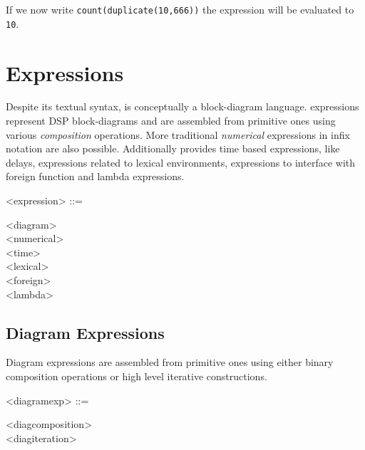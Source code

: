 \documentclass[a4paper,10pt]{book}
\begin{document}
If we now write \lstinline'count(duplicate(10,666))' the expression will be evaluated to \lstinline'10'.





 
  
\section{Expressions}

Despite its textual syntax, \faust is conceptually a block-diagram language. \faust expressions represent DSP block-diagrams and are assembled from primitive ones using various \textit{composition} operations. More traditional \textit{numerical} expressions in infix notation are also possible. Additionally \faust provides time based expressions, like delays, expressions related to lexical environments, expressions to interface with foreign function and lambda expressions.

\begin{grammar}
  <expression> ::= 
  \begin{syntdiag}
    \begin{stack}
      <diagram>\\
      <numerical>\\
      <time>\\
      <lexical>\\
      <foreign>\\
      <lambda>
    \end{stack}
  \end{syntdiag}
\end{grammar}
  
\subsection{Diagram Expressions}

Diagram expressions are assembled from primitive ones using either binary composition operations or high level iterative constructions.
 
\begin{grammar}
  <diagramexp> ::= 
  \begin{syntdiag}
    \begin{stack}
      <diagcomposition>\\
      <diagiteration>
    \end{stack}
  \end{syntdiag}
\end{grammar}
\end{document}
